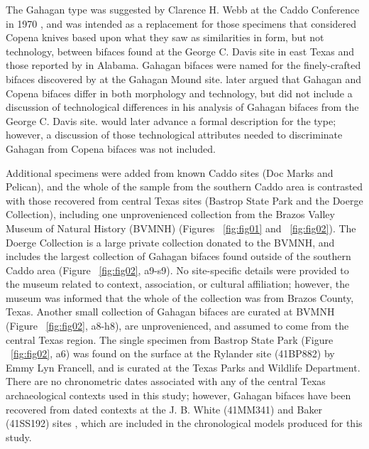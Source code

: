 \documentclass[review]{elsarticle}
\begin{document}
The Gahagan type was suggested by Clarence H. Webb at the Caddo Conference in 1970 \citep{RN3684}, and was intended as a replacement for those specimens that \cite{RN800} considered Copena knives based upon what they saw as similarities in form, but not technology, between bifaces found at the George C. Davis site in east Texas and those reported by \cite{RN11562} in Alabama. Gahagan bifaces were named for the finely-crafted bifaces discovered by \cite{RN2740} at the Gahagan Mound site. \cite{RN3684} later argued that Gahagan and Copena bifaces differ in both morphology and technology, but did not include a discussion of technological differences in his analysis of Gahagan bifaces from the George C. Davis site. \citet[22]{RN4924} would later advance a formal description for the type; however, a discussion of those technological attributes needed to discriminate Gahagan from Copena bifaces was not included. 

Additional specimens were added from known Caddo sites (Doc Marks and Pelican), and the whole of the sample from the southern Caddo area is contrasted with those recovered from central Texas sites (Bastrop State Park and the Doerge Collection), including one unprovenienced collection from the Brazos Valley Museum of Natural History (BVMNH) (Figures ~\ref{fig:fig01} and ~\ref{fig:fig02}). The Doerge Collection is a large private collection donated to the BVMNH, and includes the largest collection of Gahagan bifaces found outside of the southern Caddo area \citep[Table 5]{RN4924} (Figure ~\ref{fig:fig02}, a9-s9). No site-specific details were provided to the museum related to context, association, or cultural affiliation; however, the museum was informed that the whole of the collection was from Brazos County, Texas. Another small collection of Gahagan bifaces are curated at BVMNH (Figure ~\ref{fig:fig02}, a8-h8), are unprovenienced, and assumed to come from the central Texas region. The single specimen from Bastrop State Park (Figure ~\ref{fig:fig02}, a6) was found on the surface at the Rylander site (41BP882) by Emmy Lyn Francell, and is curated at the Texas Parks and Wildlife Department. There are no chronometric dates associated with any of the central Texas archaeological contexts used in this study; however, Gahagan bifaces have been recovered from dated contexts at the J. B. White (41MM341) \citep{RN11565} and Baker (41SS192) sites \citep{RN20909}, which are included in the chronological models produced for this study.
\end{document}
